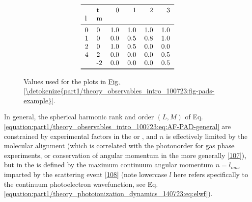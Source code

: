 \documentclass[letterpaper,table,10pt,english]{jupyterBook}
\begin{document}
\begin{figure}[htbp]
\centering
\capstart
\begin{equation*}
\begin{split}\begin{tabular}{llrrrr}
\toprule
  & t &    0 &    1 &    2 &    3 \\
l & m &      &      &      &      \\
\midrule
0 &  0 &  1.0 &  1.0 &  1.0 &  1.0 \\
1 &  0 &  0.0 &  0.5 &  0.8 &  1.0 \\
2 &  0 &  1.0 &  0.5 &  0.0 &  0.0 \\
4 &  2 &  0.0 &  0.0 &  0.0 &  0.5 \\
  & -2 &  0.0 &  0.0 &  0.0 &  0.5 \\
\bottomrule
\end{tabular}\end{split}
\end{equation*}\caption{Values used for the plots in \hyperref[\detokenize{part1/theory_observables_intro_100723:fig-pads-example}]{Fig.\@ \ref{\detokenize{part1/theory_observables_intro_100723:fig-pads-example}}}.}\label{\detokenize{part1/theory_observables_intro_100723:blm-tab}}\end{figure}

\sphinxAtStartPar
In general, the spherical harmonic rank and order \((L,M)\) of Eq. \eqref{equation:part1/theory_observables_intro_100723:eq:AF-PAD-general} are constrained by experimental factors in the {\hyperref[\detokenize{backmatter/glossary:term-LF}]{}} or {\hyperref[\detokenize{backmatter/glossary:term-AF}]{}}, and \(n\) is effectively limited by the molecular alignment (which is correlated with the photon\sphinxhyphen{}order for gas phase experiments, or conservation of angular momentum in the {\hyperref[\detokenize{backmatter/glossary:term-LF}]{}} more generally {[}\hyperlink{cite.backmatter/bibliography:id958}{107}{]}), but in the {\hyperref[\detokenize{backmatter/glossary:term-MF}]{}} is defined by the maximum continuum angular momentum \(n=l_{max}\) imparted by the scattering event {[}\hyperlink{cite.backmatter/bibliography:id572}{108}{]} (note lower\sphinxhyphen{}case \(l\) here refers specifically to the continuum photoelectron wavefunction, see Eq. \eqref{equation:part1/theory_photoionization_dynamics_140723:eq:elwf}).
\end{document}
